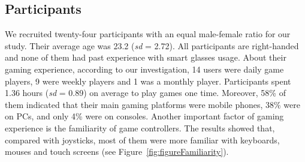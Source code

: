 \documentclass{sigchi}
\begin{document}
  \subsection {Participants}
  We recruited twenty-four participants with an equal male-female ratio for our study. Their average age was 23.2 (\textsl{sd} = 2.72). All participants are right-handed and none of them had past experience with smart glasses usage. About their gaming experience, according to our investigation, 14 users were daily game players, 9 were weekly players and 1 was a monthly player. Participants spent 1.36 hours (\textsl{sd} = 0.89) on average to play games one time. Moreover, 58\% of them indicated that their main gaming platforms were mobile phones, 38\% were on PCs, and only 4\% were on consoles. Another important factor of gaming experience is the familiarity of game controllers. The results showed that, compared with joysticks, most of them were more familiar with keyboards, mouses and touch screens (see Figure~\ref{fig:figureFamiliarity}).
\end{document}
